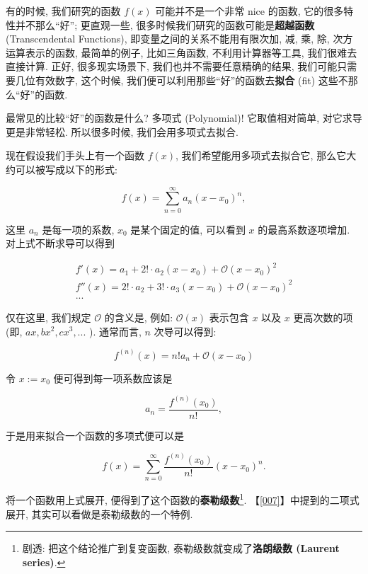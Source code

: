 \begin{tcolorbox}[size=fbox, breakable, enhanced jigsaw, title={泰勒级数 (Taylor Series)}]

有的时候, 我们研究的函数 $f(x)$ 可能并不是一个非常 nice 的函数,
它的很多特性并不那么``好''; 更直观一些,
很多时候我们研究的函数可能是\textbf{超越函数} (Transcendental
Functions), 即变量之间的关系不能用有限次加, 减, 乘, 除,
次方运算表示的函数, 最简单的例子, 比如三角函数, 不利用计算器等工具,
我们很难去直接计算. 正好, 很多现实场景下, 我们也并不需要任意精确的结果,
我们可能只需要几位有效数字, 这个时候,
我们便可以利用那些``好''的函数去\textbf{拟合} (fit)
这些不那么``好''的函数.

最常见的比较``好''的函数是什么? 多项式 (Polynomial)! 它取值相对简单,
对它求导更是非常轻松. 所以很多时候, 我们会用多项式去拟合.

现在假设我们手头上有一个函数 $f(x)$, 我们希望能用多项式去拟合它,
那么它大约可以被写成以下的形式:

\[
f(x)=\sum_{n=0}^\infty a_n(x-x_0)^n,
\]

这里 $a_n$ 是每一项的系数, $x_0$ 是某个固定的值, 可以看到 $x$
的最高系数逐项增加. 对上式不断求导可以得到

\begin{gather*}
f'(x)=a_1+2!\cdot a_2(x-x_0)+\mathcal{O}(x-x_0)^2\\
f''(x)=2!\cdot a_2+3!\cdot a_3(x-x_0)+\mathcal{O}(x-x_0)^2\\
...
\end{gather*}

仅在这里, 我们规定 $\mathcal{O}$ 的含义是, 例如: $\mathcal{O}(x)$
表示包含 $x$ 以及 $x$ 更高次数的项 (即, $ax, bx^2, cx^3, ...$ ).
通常而言, $n$ 次导可以得到:

\[
f^{(n)}(x)=n!a_n+\mathcal{O}(x-x_0)
\]

令 $x:=x_0$ 便可得到每一项系数应该是

\[
a_n=\frac{f^{(n)}(x_0)}{n!},
\]

于是用来拟合一个函数的多项式便可以是

\[
\boxed{f(x)=\sum_{n=0}^\infty\frac{f^{(n)}(x_0)}{n!}(x-x_0)^n.}
\]

将一个函数用上式展开, 便得到了这个函数的\textbf{泰勒级数}\footnote{剧透:
  把这个结论推广到复变函数, 泰勒级数就变成了\textbf{洛朗级数 (Laurent
  series)}.}. 【\ref{007}】中提到的二项式展开,
其实可以看做是泰勒级数的一个特例.

\begin{tcolorbox}[size=fbox, breakable, enhanced jigsaw, title={收敛性}]


\end{tcolorbox}
\end{tcolorbox}
